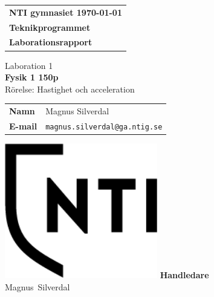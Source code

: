 \documentclass[11p, titlepage, oneside, a4paper]{article}
\makeatletter
\def\inst{Teknikprogrammet}
\def\typeofdoc{Laborationsrapport}
\def\course{Fysik 1 150p}
\def\pretitle{Laboration 1}
\def\title{Rörelse: Hastighet och acceleration}
\def\name{Magnus Silverdal}
\def\username{magnus.silverdal}
\def\email{\username{}@ga.ntig.se}
\def\graders{Magnus Silverdal}
\makeatother
\begin{document}
\begin{titlepage}
		\thispagestyle{empty}
		\begin{large}
			\begin{tabular}{@{}p{\textwidth}@{}}
				\textbf{NTI gymnasiet \hfill \today} \\
				\textbf{\inst} \\
				\textbf{\typeofdoc} \\
			\end{tabular}
		\end{large}
		\vspace{10mm}
		\begin{center}
			\LARGE{\pretitle} \\
			\huge{\textbf{\course}}\\
			\vspace{10mm}
			\LARGE{\title} \\
			\vspace{15mm}
			\begin{large}
				\begin{tabular}{ll}
					\textbf{Namn} & \name \\
					\textbf{E-mail} & \texttt{\email} \\
				\end{tabular}
			\end{large}
			\vfill
            \includegraphics[width=0.5\textwidth]{images/NTI Gymnasiet_Symbol_print_svart}
			\vfill
            \large{\textbf{Handledare}}\\
			\mbox{\large{\graders}}
		\end{center}
	\end{titlepage}

    \begin{otherlanguage}{english}
	\begin{abstract}
        This labb examines the change over velocity and acceleration of a wagon rolling down a slope. The experiment
        shows that the wagons velocity changes at a constant rate making the acceleration a constant linear line.
    \end{abstract}
    \end{otherlanguage}
	\tableofcontents
	
\end{document}
